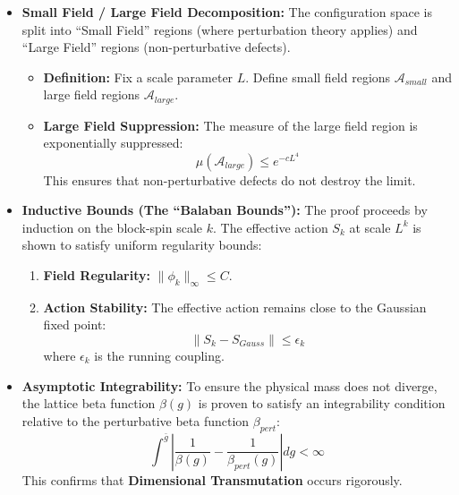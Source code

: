 \begin{itemize}
    \item \textbf{Small Field / Large Field Decomposition:} The configuration space is split into ``Small Field'' regions (where perturbation theory applies) and ``Large Field'' regions (non-perturbative defects).
    \begin{itemize}
        \item \textbf{Definition:} Fix a scale parameter $L$. Define small field regions $\mathcal{A}_{small}$ and large field regions $\mathcal{A}_{large}$.
        \item \textbf{Large Field Suppression:} The measure of the large field region is exponentially suppressed:
        \begin{equation}
        \mu(\mathcal{A}_{large}) \leq e^{-c L^4}
        \end{equation}
        This ensures that non-perturbative defects do not destroy the limit.
    \end{itemize}

    \item \textbf{Inductive Bounds (The ``Balaban Bounds''):} The proof proceeds by induction on the block-spin scale $k$. The effective action $S_k$ at scale $L^k$ is shown to satisfy uniform regularity bounds:
    \begin{enumerate}
        \item \textbf{Field Regularity:} $\|\phi_k\|_\infty \leq C$.
        \item \textbf{Action Stability:} The effective action remains close to the Gaussian fixed point:
        \begin{equation}
        \|S_k - S_{Gauss}\| \leq \epsilon_k
        \end{equation}
        where $\epsilon_k$ is the running coupling.
    \end{enumerate}

    \item \textbf{Asymptotic Integrability:} To ensure the physical mass does not diverge, the lattice beta function $\beta(g)$ is proven to satisfy an integrability condition relative to the perturbative beta function $\beta_{pert}$:
    \begin{equation}
    \int^{\bar{g}} \left| \frac{1}{\beta(g)} - \frac{1}{\beta_{pert}(g)} \right| dg < \infty
    \end{equation}
    This confirms that \textbf{Dimensional Transmutation} occurs rigorously.
\end{itemize}

